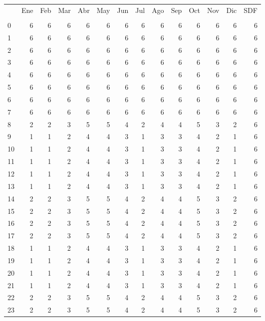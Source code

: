 \documentclass[a4paper,10pt,twocolumn]{article}
\begin{document}
\begin{Form}
                    \begin{table}[H] \centering
                        {
                        \begin{tabular}{lrrrrrrrrrrrrr}
\toprule
 & Ene & Feb & Mar & Abr & May & Jun & Jul & Ago & Sep & Oct & Nov & Dic & SDF \\
 &  &  &  &  &  &  &  &  &  &  &  &  &  \\
\midrule
0 & 6 & 6 & 6 & 6 & 6 & 6 & 6 & 6 & 6 & 6 & 6 & 6 & 6 \\
1 & 6 & 6 & 6 & 6 & 6 & 6 & 6 & 6 & 6 & 6 & 6 & 6 & 6 \\
2 & 6 & 6 & 6 & 6 & 6 & 6 & 6 & 6 & 6 & 6 & 6 & 6 & 6 \\
3 & 6 & 6 & 6 & 6 & 6 & 6 & 6 & 6 & 6 & 6 & 6 & 6 & 6 \\
4 & 6 & 6 & 6 & 6 & 6 & 6 & 6 & 6 & 6 & 6 & 6 & 6 & 6 \\
5 & 6 & 6 & 6 & 6 & 6 & 6 & 6 & 6 & 6 & 6 & 6 & 6 & 6 \\
6 & 6 & 6 & 6 & 6 & 6 & 6 & 6 & 6 & 6 & 6 & 6 & 6 & 6 \\
7 & 6 & 6 & 6 & 6 & 6 & 6 & 6 & 6 & 6 & 6 & 6 & 6 & 6 \\
8 & 2 & 2 & 3 & 5 & 5 & 4 & 2 & 4 & 4 & 5 & 3 & 2 & 6 \\
9 & 1 & 1 & 2 & 4 & 4 & 3 & 1 & 3 & 3 & 4 & 2 & 1 & 6 \\
10 & 1 & 1 & 2 & 4 & 4 & 3 & 1 & 3 & 3 & 4 & 2 & 1 & 6 \\
11 & 1 & 1 & 2 & 4 & 4 & 3 & 1 & 3 & 3 & 4 & 2 & 1 & 6 \\
12 & 1 & 1 & 2 & 4 & 4 & 3 & 1 & 3 & 3 & 4 & 2 & 1 & 6 \\
13 & 1 & 1 & 2 & 4 & 4 & 3 & 1 & 3 & 3 & 4 & 2 & 1 & 6 \\
14 & 2 & 2 & 3 & 5 & 5 & 4 & 2 & 4 & 4 & 5 & 3 & 2 & 6 \\
15 & 2 & 2 & 3 & 5 & 5 & 4 & 2 & 4 & 4 & 5 & 3 & 2 & 6 \\
16 & 2 & 2 & 3 & 5 & 5 & 4 & 2 & 4 & 4 & 5 & 3 & 2 & 6 \\
17 & 2 & 2 & 3 & 5 & 5 & 4 & 2 & 4 & 4 & 5 & 3 & 2 & 6 \\
18 & 1 & 1 & 2 & 4 & 4 & 3 & 1 & 3 & 3 & 4 & 2 & 1 & 6 \\
19 & 1 & 1 & 2 & 4 & 4 & 3 & 1 & 3 & 3 & 4 & 2 & 1 & 6 \\
20 & 1 & 1 & 2 & 4 & 4 & 3 & 1 & 3 & 3 & 4 & 2 & 1 & 6 \\
21 & 1 & 1 & 2 & 4 & 4 & 3 & 1 & 3 & 3 & 4 & 2 & 1 & 6 \\
22 & 2 & 2 & 3 & 5 & 5 & 4 & 2 & 4 & 4 & 5 & 3 & 2 & 6 \\
23 & 2 & 2 & 3 & 5 & 5 & 4 & 2 & 4 & 4 & 5 & 3 & 2 & 6 \\
\bottomrule
\end{tabular}

}
\end{table}
\end{Form}
\end{document}
